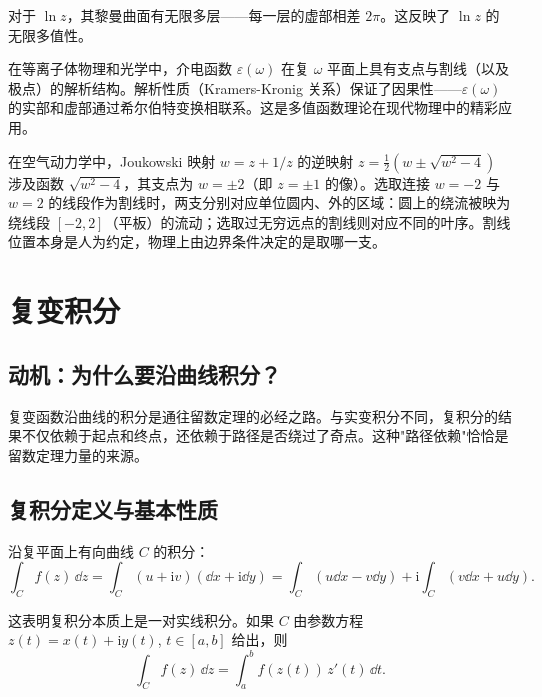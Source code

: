 对于 $\ln z$，其黎曼曲面有无限多层——每一层的虚部相差 $2\pi$。这反映了 $\ln z$ 的无限多值性。

\begin{example}
在等离子体物理和光学中，介电函数 $\varepsilon(\omega)$ 在复 $\omega$ 平面上具有支点与割线（以及极点）的解析结构。解析性质（Kramers-Kronig 关系）保证了因果性——$\varepsilon(\omega)$ 的实部和虚部通过希尔伯特变换相联系。这是多值函数理论在现代物理中的精彩应用。
\end{example}

\begin{example}
在空气动力学中，Joukowski 映射 $w = z + 1/z$ 的逆映射 $z = \frac12(w\pm\sqrt{w^2-4})$ 涉及函数 $\sqrt{w^2-4}$，其支点为 $w=\pm2$（即 $z=\pm1$ 的像）。选取连接 $w=-2$ 与 $w=2$ 的线段作为割线时，两支分别对应单位圆内、外的区域：圆上的绕流被映为绕线段 $[-2,2]$（平板）的流动；选取过无穷远点的割线则对应不同的叶序。割线位置本身是人为约定，物理上由边界条件决定的是取哪一支。
\end{example}

\section{复变积分}
\label{sec:complex_integration}

\subsection*{动机：为什么要沿曲线积分？}

复变函数沿曲线的积分是通往留数定理的必经之路。与实变积分不同，复积分的结果不仅依赖于起点和终点，还依赖于路径是否绕过了奇点。这种"路径依赖"恰恰是留数定理力量的来源。

\subsection{复积分定义与基本性质}

沿复平面上有向曲线 $C$ 的积分：
\begin{equation}
\int_C f(z)\,\dd z = \int_C (u+\mathrm{i}v)(\dd x + \mathrm{i}\dd y)
= \int_C (u\dd x - v\dd y) + \mathrm{i}\int_C (v\dd x + u\dd y).
\end{equation}

这表明复积分本质上是一对实线积分。如果 $C$ 由参数方程 $z(t) = x(t) + \mathrm{i}y(t)$, $t\in[a,b]$ 给出，则
\begin{equation}
\int_C f(z)\,\dd z = \int_a^b f(z(t))\,z'(t)\,\dd t.
\end{equation}

